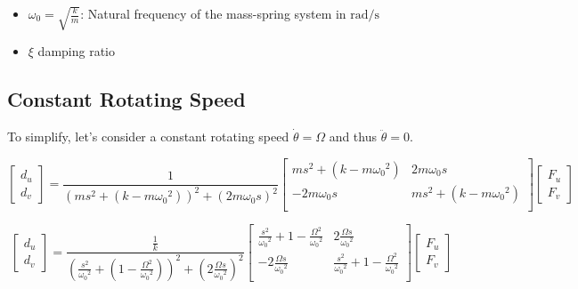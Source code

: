 \documentclass{ISMA_USD2020}
\begin{document}
\begin{itemize}
\item \(\omega_0 = \sqrt{\frac{k}{m}}\): Natural frequency of the mass-spring system in \(\si{\radian/\s}\)
\item \(\xi\) damping ratio
\end{itemize}


\subsection{Constant Rotating Speed}
\label{sec:org81c7074}
To simplify, let's consider a constant rotating speed \(\dot{\theta} = \Omega\) and thus \(\ddot{\theta} = 0\).

\begin{equation}
\label{eq:coupledplant}
\begin{bmatrix} d_u \\ d_v \end{bmatrix} =
\frac{1}{(m s^2 + (k - m{\omega_0}^2))^2 + (2 m {\omega_0} s)^2}
\begin{bmatrix}
  ms^2 + (k-m{\omega_0}^2) & 2 m \omega_0 s \\
  -2 m \omega_0 s          & ms^2 + (k-m{\omega_0}^2) \\
\end{bmatrix}
\begin{bmatrix} F_u \\ F_v \end{bmatrix}
\end{equation}

\begin{equation}
\label{eq:coupled_plant}
\begin{bmatrix} d_u \\ d_v \end{bmatrix} =
\frac{\frac{1}{k}}{\left( \frac{s^2}{{\omega_0}^2} + (1 - \frac{{\Omega}^2}{{\omega_0}^2}) \right)^2 + \left( 2 \frac{{\Omega} s}{{\omega_0}^2} \right)^2}
\begin{bmatrix}
  \frac{s^2}{{\omega_0}^2} + 1 - \frac{{\Omega}^2}{{\omega_0}^2} & 2 \frac{\Omega s}{{\omega_0}^2} \\
  -2 \frac{\Omega s}{{\omega_0}^2}          & \frac{s^2}{{\omega_0}^2} + 1 - \frac{{\Omega}^2}{{\omega_0}^2} \\
\end{bmatrix}
\begin{bmatrix} F_u \\ F_v \end{bmatrix}
\end{equation}
\end{document}
